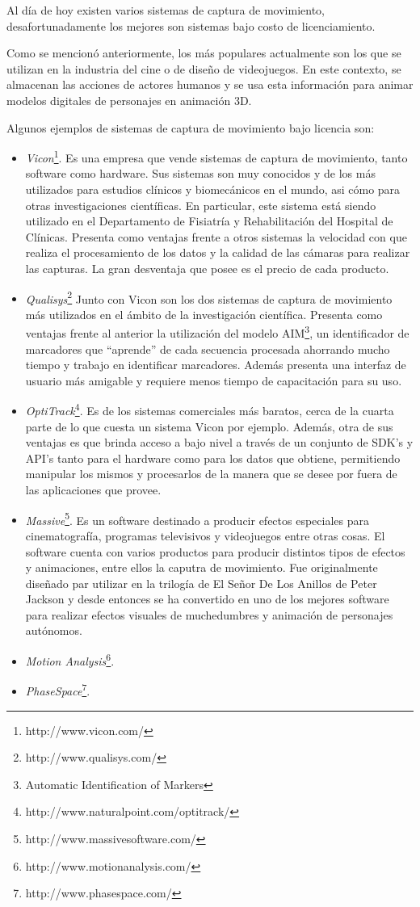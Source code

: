 Al día de hoy existen varios sistemas de captura de movimiento, desafortunadamente los mejores son sistemas bajo costo de licenciamiento. 

Como se mencionó anteriormente, los más populares actualmente son los que se utilizan en la industria del cine o de diseño de videojuegos. En este contexto, se almacenan las acciones de actores humanos y se usa esta información para animar modelos digitales de personajes en animación 3D.

Algunos ejemplos de sistemas de captura de movimiento bajo licencia son:

\begin{itemize}
\item \emph{Vicon}\footnote{http://www.vicon.com/}. Es una empresa que vende sistemas de captura de movimiento, tanto software como hardware. Sus sistemas son muy conocidos y de los más utilizados para estudios clínicos y biomecánicos en el mundo, asi cómo para otras investigaciones científicas. En particular, este sistema está siendo utilizado en el Departamento de Fisiatría y Rehabilitación del Hospital de Clínicas. Presenta como ventajas frente a otros sistemas la velocidad con que realiza el procesamiento de los datos y la calidad de las cámaras para realizar las capturas. La gran desventaja que posee es el precio de cada producto.
\item \emph{Qualisys}\footnote{http://www.qualisys.com/} Junto con Vicon son los dos sistemas de captura de movimiento más utilizados en el ámbito de la investigación científica. Presenta como ventajas frente al anterior la utilización del modelo AIM\footnote{Automatic Identification of Markers}, un identificador de marcadores que ``aprende'' de cada secuencia procesada ahorrando mucho tiempo y trabajo en identificar marcadores. Además presenta una interfaz de usuario más amigable y requiere menos tiempo de capacitación para su uso.
\item \emph{OptiTrack}\footnote{http://www.naturalpoint.com/optitrack/}. Es de los sistemas comerciales más baratos, cerca de la cuarta parte de lo que cuesta un sistema Vicon por ejemplo. Además, otra de sus ventajas es que brinda acceso a bajo nivel a través de un conjunto de  SDK's y API's tanto para el hardware como para los datos que obtiene, permitiendo manipular los mismos y procesarlos de la manera que se desee por fuera de las aplicaciones que provee. 
\item \emph{Massive}\footnote{http://www.massivesoftware.com/}. Es un software destinado a producir efectos especiales para cinematografía, programas televisivos y videojuegos entre otras cosas. El software cuenta con varios productos para producir distintos tipos de efectos y animaciones, entre ellos la caputra de movimiento. Fue originalmente diseñado par utilizar en la trilogía de El Señor De Los Anillos de Peter Jackson y desde entonces se ha convertido en uno de los mejores software para realizar efectos visuales de muchedumbres y animación de personajes autónomos.
\item \emph{Motion Analysis}\footnote{http://www.motionanalysis.com/}.
\item \emph{PhaseSpace}\footnote{http://www.phasespace.com/}.
\end{itemize}

